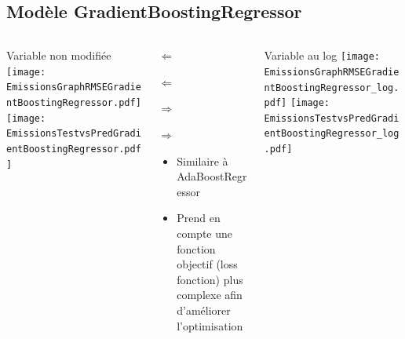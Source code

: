 \documentclass[8pt,aspectratio=169,hyperref={unicode=true}]{beamer}
\begin{document}
\subsection{Modèle GradientBoostingRegressor}
\begin{frame}{\insertsubsection}
  \begin{columns}[t]
    \begin{column}{.33\textwidth}
      \centering Variable non modifiée
      \texttt{[image: EmissionsGraphRMSEGradientBoostingRegressor.pdf]}
      \texttt{[image: EmissionsTestvsPredGradientBoostingRegressor.pdf]}
    \end{column}
    \begin{column}{.33\textwidth}
      $\Longleftarrow$
      \scriptsize
      {\centering
        }
      

      \normalsize
      $\Longleftarrow$

      \raggedleft $\Longrightarrow$
      \scriptsize
      {\centering
        }
      

      \normalsize
      $\Longrightarrow$

      \raggedright
      \begin{itemize}
        \item Similaire à AdaBoostRegressor 
        \item Prend en compte une fonction objectif (loss fonction) plus complexe afin
              d'améliorer l'optimisation
      \end{itemize}
    \end{column}
    \begin{column}{.33\textwidth}
      \centering Variable au log
      \texttt{[image: EmissionsGraphRMSEGradientBoostingRegressor\_log.pdf]}
      \texttt{[image: EmissionsTestvsPredGradientBoostingRegressor\_log.pdf]}
    \end{column}
  \end{columns}
\end{frame}
\end{document}

